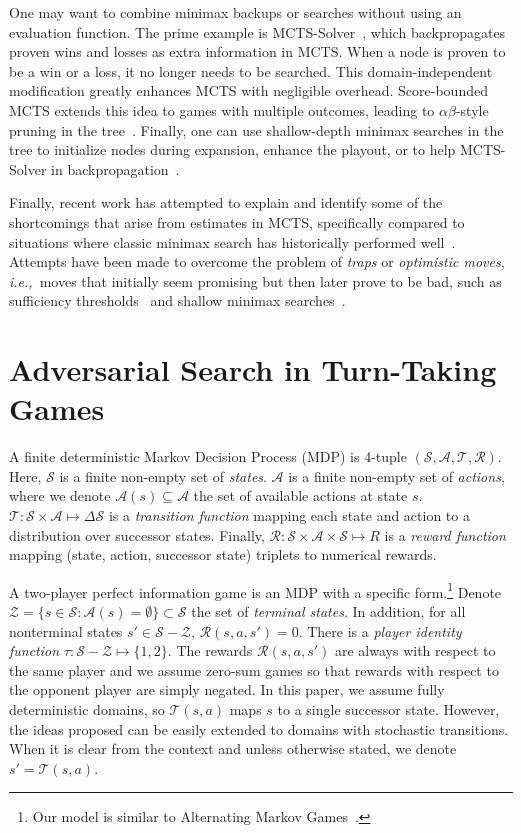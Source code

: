 \documentclass{article}
\newcommand{\cA}{\mathcal{A}}
\newcommand{\cR}{\mathcal{R}}
\newcommand{\cS}{\mathcal{S}}
\newcommand{\cT}{\mathcal{T}}
\newcommand{\cZ}{\mathcal{Z}}
\newcommand{\ie}{{\it i.e.,}~}
\begin{document}
One may want to combine minimax backups or searches without using an evaluation function. 
The prime example is MCTS-Solver~\cite{Winands08Solver}, which backpropagates proven wins and losses as 
extra information in MCTS. When a node is proven to be a 
win or a loss, it no longer needs to be searched. This domain-independent modification greatly enhances 
MCTS with negligible overhead. Score-bounded MCTS extends this idea to games with multiple 
outcomes, leading to $\alpha \beta$-style pruning in the tree~\cite{Cazenave10Score}. Finally, one can use shallow-depth
minimax searches in the tree to initialize nodes during expansion, enhance the playout, or to help MCTS-Solver 
in backpropagation~\cite{Baier13MinimaxHybrids}.

Finally, recent work has attempted to explain and identify some of the shortcomings that arise from estimates in 
MCTS, specifically compared to situations where classic minimax search has historically performed 
well~\cite{Ramanujan10Understanding,Ramanujan10On}. 
Attempts have been made to overcome the problem of {\it traps} or {\it optimistic moves}, \ie moves that initially seem 
promising but then later prove to be bad, such as sufficiency 
thresholds~\cite{Gudmindsson13Sufficiency} and shallow minimax searches~\cite{Baier13MinimaxHybrids}. 


\section{Adversarial Search in Turn-Taking Games}

A finite deterministic Markov Decision Process (MDP) is 4-tuple $(\cS, \cA, \cT, \cR)$. Here, $\cS$ is a finite non-empty set of {\it states}. 
$\cA$ is a finite non-empty set of {\it actions}, where we denote $\cA(s) \subseteq \cA$ the set of available actions at state $s$. 
$\cT : \cS \times \cA \mapsto \Delta \cS$ is a {\it transition function} mapping 
each state and action to a distribution over successor states. Finally, $\cR : \cS \times \cA \times \cS \mapsto R$ 
is a {\it reward function} mapping (state, action, successor state) triplets to numerical rewards. 

A two-player perfect information game is an MDP with a specific form.\footnote{Our model is 
similar to Alternating Markov Games~\cite{Littman96ageneralized}.}
Denote $\cZ = \{ s \in \cS: \cA(s) = \emptyset \} \subset \cS$ the set of {\it terminal states}. 
In addition, for all nonterminal states $s' \in \cS - \cZ$, $\cR(s,a,s') = 0$. 
There is a {\it player identity function} $\tau : \cS - \cZ \mapsto \{1,2\}$. 
The rewards $\cR(s,a,s')$ are always with respect to the same player and  
we assume zero-sum games so that rewards with respect to the opponent player are simply negated. 
In this paper, we assume fully deterministic domains, so $\cT(s,a)$ maps $s$ to a single successor 
state. 
However, the ideas proposed can be easily extended to domains with stochastic transitions. 
When it is clear from the context and unless otherwise stated, we denote $s' = \cT(s,a)$. 
\end{document}
